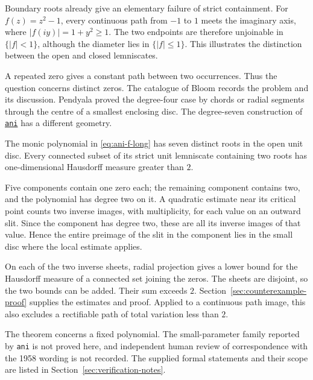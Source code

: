 \documentclass[11pt]{article}
\begin{document}
Boundary roots already give an elementary failure of strict containment.
For $f(z)=z^2-1$, every continuous path from $-1$ to $1$ meets the
imaginary axis, where $|f(iy)|=1+y^2\ge1$. The two endpoints are therefore
unjoinable in $\{|f|<1\}$, although the diameter lies in $\{|f|\le1\}$.
This illustrates the distinction between the open and closed lemniscates.

A repeated zero gives a constant path between two occurrences. Thus the
question concerns distinct zeros. The catalogue of Bloom \cite{bloom}
records the problem and its discussion. Pendyala
\cite[Theorem~1 and Lemma~1]{june2026} proved the degree-four case by
chords or radial segments through the centre of a smallest enclosing disc.
The degree-seven construction of
\href{https://www.erdosproblems.com/forum/thread/1041\#post-8861}{\texttt{ani}}
has a different geometry.

\begin{theorem}\label{res:ani-degree-seven-counterexample-long}
The monic polynomial in \eqref{eq:ani-f-long} has seven distinct roots
in the open unit disc. Every connected subset of its strict unit
lemniscate containing two roots has one-dimensional Hausdorff measure
greater than $2$.
\end{theorem}

Five components contain one zero each; the remaining component
contains two, and the polynomial has degree two on it. A quadratic
estimate near its critical point counts two inverse images, with
multiplicity, for each value on an outward slit. Since the component has degree two, these
are all its inverse images of that value. Hence the entire preimage
of the slit in the component lies in the small disc where the local
estimate applies.

On each of the two inverse sheets, radial projection gives a lower
bound for the Hausdorff measure of a connected set joining the zeros.
The sheets are disjoint, so the two bounds can be added. Their sum
exceeds $2$.
Section~\ref{sec:counterexample-proof} supplies the estimates and proof.
Applied to a continuous path image, this also excludes a rectifiable
path of total variation less than $2$.

The theorem concerns a fixed polynomial. The small-parameter family
reported by \texttt{ani} is not proved here, and independent human review
of correspondence with the 1958 wording is not recorded. The supplied
formal statements and their scope are listed in
Section~\ref{sec:verification-notes}.
\end{document}
